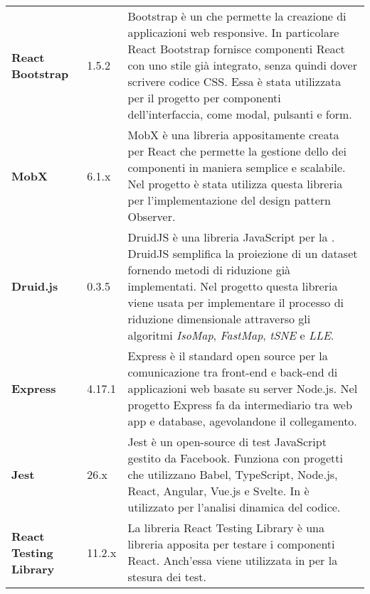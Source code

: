 {\begin{longtable}{C{3cm} C{2cm} C{10cm}}
	\textbf{React Bootstrap} & 
	1.5.2 &
	Bootstrap è un  che permette la creazione di applicazioni web responsive. In particolare React Bootstrap fornisce componenti React con uno stile già integrato, senza quindi dover scrivere codice CSS. Essa è stata utilizzata per il progetto per componenti dell'interfaccia, come modal, pulsanti e form.\\
		
	\textbf{MobX} & 
	6.1.x &
	MobX è una libreria appositamente creata per React che permette la gestione dello  dei componenti in maniera semplice e scalabile. Nel progetto \NomeProgetto{} è stata utilizza questa libreria per l'implementazione del design pattern Observer.\\
	
	\textbf{Druid.js} & 
	0.3.5 &
	DruidJS è una libreria JavaScript per la . DruidJS semplifica la proiezione di un dataset fornendo metodi di riduzione già implementati.
Nel progetto \NomeProgetto{} questa libreria viene usata per implementare il processo di riduzione dimensionale attraverso gli algoritmi \textit{IsoMap}, \textit{FastMap}, \textit{tSNE} e \textit{LLE}.\\

	\textbf{Express} & 
	4.17.1 &
	Express è il  standard open source per la comunicazione tra front-end e back-end di applicazioni web basate su server Node.js. 
Nel progetto \NomeProgetto{} Express fa da intermediario tra web app e database, agevolandone il collegamento.\\

	\textbf{Jest} & 
	26.x &
	Jest è un  open-source di test JavaScript gestito da Facebook. Funziona con progetti che utilizzano Babel, TypeScript, Node.js, React, Angular, Vue.js e Svelte. In \NomeProgetto{} è utilizzato per l'analisi dinamica del codice.\\

	\textbf{React Testing Library} & 
	11.2.x &
	La libreria React Testing Library è una libreria apposita per testare i componenti React. Anch'essa viene utilizzata in \NomeProgetto{} per la stesura dei test.\\
\end{longtable}	
}



